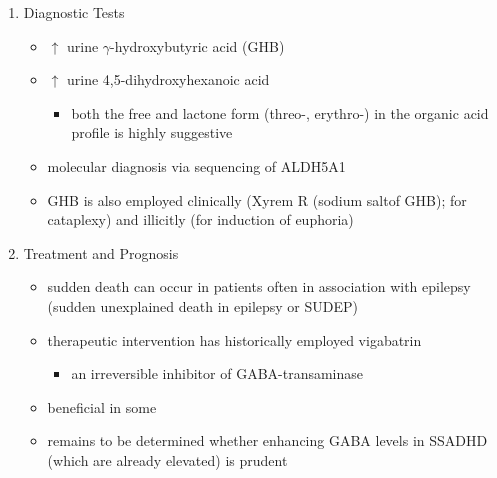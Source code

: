 \documentclass{scrartcl}
\begin{document}
\begin{enumerate}
\item Diagnostic Tests
\label{sec:orgb4a8d6a}
\begin{itemize}
\item \(\uparrow\) urine \(\gamma\)-hydroxybutyric acid (GHB)
\item \(\uparrow\) urine 4,5-dihydroxyhexanoic acid
\begin{itemize}
\item both the free and lactone form (threo-, erythro-) in the organic acid profile
is highly suggestive
\end{itemize}
\item molecular diagnosis via sequencing of ALDH5A1
\item GHB is also employed clinically (Xyrem R (sodium saltof GHB); for
cataplexy) and illicitly (for induction of euphoria)
\end{itemize}

\item Treatment and Prognosis
\label{sec:org59c5336}
\begin{itemize}
\item sudden death can occur in patients often in association with
epilepsy (sudden unexplained death in epilepsy or SUDEP)
\item therapeutic intervention has historically employed vigabatrin
\begin{itemize}
\item an irreversible inhibitor of GABA-transaminase
\end{itemize}
\item beneficial in some
\item remains to be determined whether enhancing GABA levels in SSADHD
(which are already elevated) is prudent
\end{itemize}
\end{enumerate}
\end{document}
